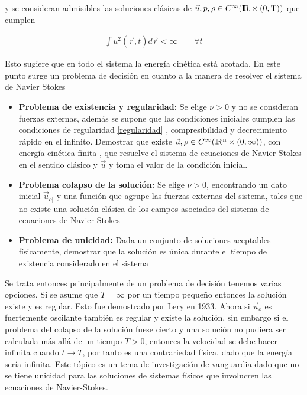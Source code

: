\noindent y se consideran admisibles las soluciones clásicas de $\vec{u},p,\rho\in C^{\infty}(\rm I\!R\times(0,T))$ que cumplen 

\begin{eqnarray}
\int u^{2}(\vec{r},t)d\vec{r} < \infty\qquad \forall t
\end{eqnarray}

\noindent Esto sugiere que en todo el sistema la energía cinética está acotada. En este punto surge un problema de decisión en cuanto a la manera de resolver el sistema de Navier Stokes

\begin{itemize}
    \item \textbf{Problema de existencia y regularidad:} Se elige $\nu > 0$ y no se consideran fuerzas externas, además se supone que las condiciones iniciales cumplen las condiciones de regularidad \eqref{regularidad} , compresibilidad y decrecimiento rápido en el infinito. Demostrar que existe $\vec{u},\rho\in C^{\infty}(\rm I\!R^{n}\times(0,\infty))$, con energía cinética finita , que resuelve el sistema de ecuaciones de Navier-Stokes en el sentido clásico y $\vec{u}$ y toma el valor de la condición inicial. 
    
    
    
    \item \textbf{Problema colapso de la solución:} Se elige $\nu>0$, encontrando un dato inicial $\vec{u}_{o]}$ y una función que agrupe las fuerzas externas del sistema, tales que no existe una solución clásica de los campos asociados del sistema de ecuaciones de Navier-Stokes 
    
    \item \textbf{Problema de unicidad:} Dada un conjunto de soluciones aceptables físicamente, demostrar que la solución es única durante el tiempo de existencia considerado en el sistema 
    
\end{itemize}

\noindent Se trata entonces principalmente de un problema de decisión tenemos varias opciones. Sí se asume que $T=\infty$ por un tiempo pequeño entonces la solución existe y es regular. Esto fue demostrado por Lery en 1933. Ahora si $\vec{u}_{o}$ es fuertemente oscilante también es regular y existe la solución, sin embargo si el problema del colapso de la solución fuese cierto y una solución no pudiera ser calculada más allá de un tiempo $T>0$, entonces la velocidad se debe hacer infinita cuando $t\rightarrow T$, por tanto es una contrariedad física, dado que la energía sería infinita. Este tópico es un tema de investigación de vanguardia dado que no se tiene unicidad para las soluciones de sistemas físicos que involucren las ecuaciones de Navier-Stokes.

